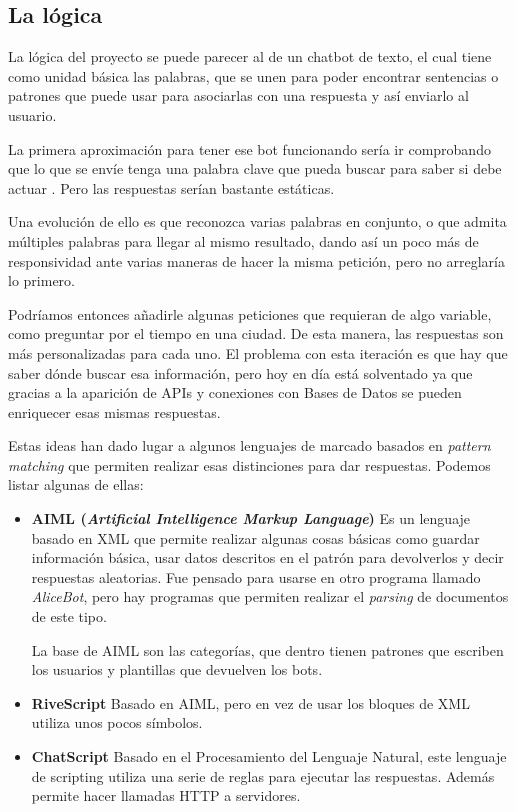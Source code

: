\subsection{La lógica}

La lógica del proyecto se puede parecer al de un chatbot de texto, el cual tiene como unidad básica las palabras, que se unen para poder encontrar sentencias o patrones que puede usar para asociarlas con una respuesta y así enviarlo al usuario.

La primera aproximación para tener ese bot funcionando sería ir comprobando que lo que se envíe tenga una palabra clave que pueda buscar para saber si debe actuar \cite{chatbots-architecture}. Pero las respuestas serían bastante estáticas.

Una evolución de ello es que reconozca varias palabras en conjunto, o que admita múltiples palabras para llegar al mismo resultado, dando así un poco más de responsividad ante varias maneras de hacer la misma petición, pero no arreglaría lo primero.

Podríamos entonces añadirle algunas peticiones que requieran de algo variable, como preguntar por el tiempo en una ciudad. De esta manera, las respuestas son más personalizadas para cada uno. El problema con esta iteración es que hay que saber dónde buscar esa información, pero hoy en día está solventado ya que gracias a la aparición de APIs y conexiones con Bases de Datos se pueden enriquecer esas mismas respuestas.

Estas ideas han dado lugar a algunos lenguajes de marcado basados en \textit{pattern matching} que permiten realizar esas distinciones para dar respuestas. Podemos listar algunas de ellas:
\begin{itemize}
	\item \textbf{AIML (\textit{Artificial Intelligence Markup Language})} \cite{aiml} Es un lenguaje basado en XML que permite realizar algunas cosas básicas como guardar información básica, usar datos descritos en el patrón para devolverlos y decir respuestas aleatorias. Fue pensado para usarse en otro programa llamado \textit{AliceBot}, pero hay programas que permiten realizar el \textit{parsing} de documentos de este tipo.
	
	La base de AIML son las categorías, que dentro tienen patrones que escriben los usuarios y plantillas que devuelven los bots.
	
	\item \textbf{RiveScript} \cite{rivescript} Basado en AIML, pero en vez de usar los bloques de XML utiliza unos pocos símbolos.
	
	\item \textbf{ChatScript} \cite{chatscript} Basado en el Procesamiento del Lenguaje Natural, este lenguaje de scripting utiliza una serie de reglas para ejecutar las respuestas. Además permite hacer llamadas HTTP a servidores.
\end{itemize}

